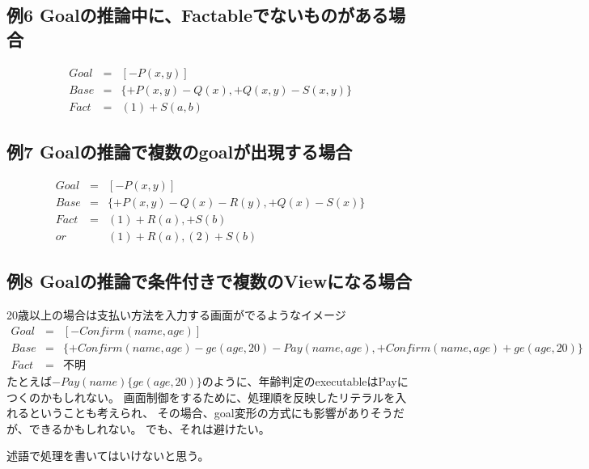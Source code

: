 \documentclass[10pt, onecolumn]{jarticle}   	%
\begin{document}
\subsection{例6 Goalの推論中に、Factableでないものがある場合}
\begin{eqnarray*}
Goal &=& [-P(x,y)] \\
Base &=& \{+P(x,y)-Q(x), +Q(x,y)-S(x,y)\} \\
Fact &=&(1) +S(a,b)
\end{eqnarray*}

\subsection{例7 Goalの推論で複数のgoalが出現する場合}
\begin{eqnarray*}
Goal &=& [-P(x,y)] \\
Base &=& \{+P(x,y)-Q(x)-R(y), +Q(x)-S(x)\} \\
Fact &=&(1) +R(a), +S(b) \\
or 
& & (1) +R(a), (2) +S(b)
\end{eqnarray*}

\subsection{例8 Goalの推論で条件付きで複数のViewになる場合}
20歳以上の場合は支払い方法を入力する画面がでるようなイメージ
\begin{eqnarray*}
Goal &=& [-Confirm(name, age)] \\
Base &=& \{+Confirm(name, age)-ge(age,20)-Pay(name,age),
+Confirm(name, age) +ge(age,20)\} \\
Fact &=& 不明
\end{eqnarray*}
たとえば$-Pay(name)\{ge(age,20)\}$のように、年齢判定のexecutableはPayにつくのかもしれない。
画面制御をするために、処理順を反映したリテラルを入れるということも考えられ、
その場合、goal変形の方式にも影響がありそうだが、できるかもしれない。
でも、それは避けたい。

述語で処理を書いてはいけないと思う。

\newpage
\end{document}
